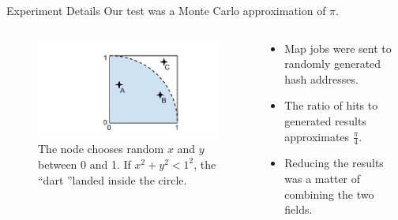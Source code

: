\documentclass[11pt]{beamer}
\begin{document}
\begin{frame}{Experiment Details}
	Our test was a Monte Carlo approximation of $\pi$.
	\begin{columns}[T]
	
	
		\begin{column}{.5\textwidth}
		
			\begin{figure}
			    \includegraphics[width=\linewidth]{figs/dartboard}
			    \caption{The node chooses random $x$ and $y$ between 0 and 1. If $x^{2} + y^{2} < 1^{2} $, the ``dart ''landed inside the circle.}
			    \label{dartboard}
			\end{figure}
			
			
		\end{column}
			
		\begin{column}{.5\textwidth}
			\begin{itemize}
				\item Map jobs were sent to randomly generated hash addresses.
				\item The ratio of hits to generated results approximates $\frac{\pi}{4}$.
				\item Reducing the results was a matter of combining the two fields.
			\end{itemize}
		\end{column}
		
	\end{columns}
\end{frame}


\end{document}
